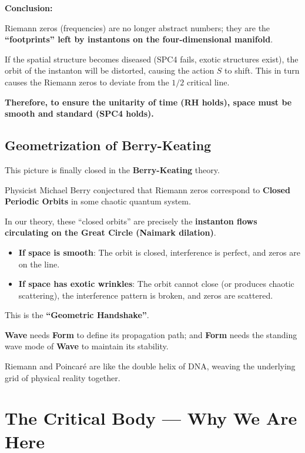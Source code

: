 \documentclass[11pt,a4paper,twoside]{book}
\begin{document}
\textbf{Conclusion:}

Riemann zeros (frequencies) are no longer abstract numbers; they are the \textbf{``footprints'' left by instantons on the four-dimensional manifold}.

If the spatial structure becomes diseased (SPC4 fails, exotic structures exist), the orbit of the instanton will be distorted, causing the action $S$ to shift. This in turn causes the Riemann zeros to deviate from the $1/2$ critical line.

\textbf{Therefore, to ensure the unitarity of time (RH holds), space must be smooth and standard (SPC4 holds).}

\subsection{Geometrization of Berry-Keating}

This picture is finally closed in the \textbf{Berry-Keating} theory.

Physicist Michael Berry conjectured that Riemann zeros correspond to \textbf{Closed Periodic Orbits} in some chaotic quantum system.

In our theory, these ``closed orbits'' are precisely the \textbf{instanton flows circulating on the Great Circle (Naimark dilation)}.

\begin{itemize}
\item \textbf{If space is smooth}: The orbit is closed, interference is perfect, and zeros are on the line.

\item \textbf{If space has exotic wrinkles}: The orbit cannot close (or produces chaotic scattering), the interference pattern is broken, and zeros are scattered.
\end{itemize}

This is the \textbf{``Geometric Handshake''}.

\textbf{Wave} needs \textbf{Form} to define its propagation path; and \textbf{Form} needs the standing wave mode of \textbf{Wave} to maintain its stability.

Riemann and Poincaré are like the double helix of DNA, weaving the underlying grid of physical reality together.

\section{The Critical Body — Why We Are Here}
\end{document}
